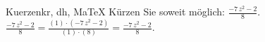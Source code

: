 \begin{MAufgabe}{Kuerzen}{kr, dh, MaTeX}
K\"urzen Sie soweit m\"oglich: $\frac{ - 7\, z^2 - 2}{8}$.\\ 
\ifLsg\MLoesung
\quad $\frac{ - 7\, z^2 - 2}{8}=\frac{(1)\cdot( - 7\, z^2 - 2)}{(1)\cdot(8)}=\frac{ - 7\, z^2 - 2}{8}$.\else\relax\fi
 \end{MAufgabe}